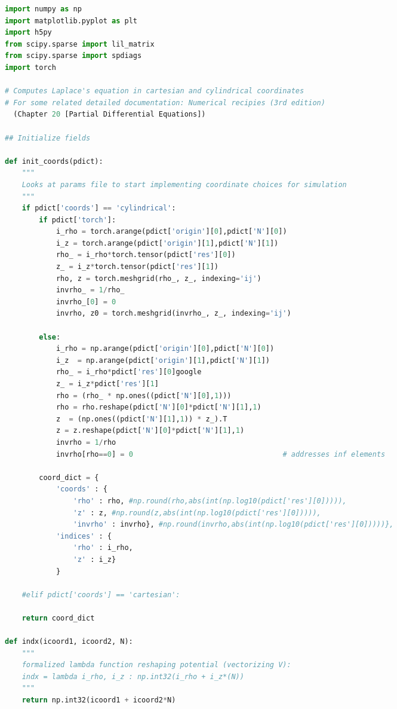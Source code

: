 \begin{spacing}{1.2}
\begin{lstlisting}[frame=single, language=Python]
import numpy as np
import matplotlib.pyplot as plt
import h5py
from scipy.sparse import lil_matrix
from scipy.sparse import spdiags
import torch

# Computes Laplace's equation in cartesian and cylindrical coordinates
# For some related detailed documentation: Numerical recipies (3rd edition) 
  (Chapter 20 [Partial Differential Equations])

## Initialize fields

def init_coords(pdict):
    """ 
    Looks at params file to start implementing coordinate choices for simulation
    """
    if pdict['coords'] == 'cylindrical':
        if pdict['torch']:
            i_rho = torch.arange(pdict['origin'][0],pdict['N'][0])
            i_z = torch.arange(pdict['origin'][1],pdict['N'][1])
            rho_ = i_rho*torch.tensor(pdict['res'][0])
            z_ = i_z*torch.tensor(pdict['res'][1])
            rho, z = torch.meshgrid(rho_, z_, indexing='ij')
            invrho_ = 1/rho_
            invrho_[0] = 0
            invrho, z0 = torch.meshgrid(invrho_, z_, indexing='ij')
            
        else:
            i_rho = np.arange(pdict['origin'][0],pdict['N'][0])
            i_z  = np.arange(pdict['origin'][1],pdict['N'][1])                                          
            rho_ = i_rho*pdict['res'][0]google
            z_ = i_z*pdict['res'][1]
            rho = (rho_ * np.ones((pdict['N'][0],1)))
            rho = rho.reshape(pdict['N'][0]*pdict['N'][1],1)
            z  = (np.ones((pdict['N'][1],1)) * z_).T
            z = z.reshape(pdict['N'][0]*pdict['N'][1],1)
            invrho = 1/rho
            invrho[rho==0] = 0                                   # addresses inf elements
            
        coord_dict = {
            'coords' : {
                'rho' : rho, #np.round(rho,abs(int(np.log10(pdict['res'][0])))),
                'z' : z, #np.round(z,abs(int(np.log10(pdict['res'][0])))),
                'invrho' : invrho}, #np.round(invrho,abs(int(np.log10(pdict['res'][0]))))},
            'indices' : {
                'rho' : i_rho,
                'z' : i_z}
            }
        
    #elif pdict['coords'] == 'cartesian': 
    
    return coord_dict

def indx(icoord1, icoord2, N):
    """
    formalized lambda function reshaping potential (vectorizing V):
    indx = lambda i_rho, i_z : np.int32(i_rho + i_z*(N))
    """
    return np.int32(icoord1 + icoord2*N)


\end{lstlisting}
\end{spacing}
